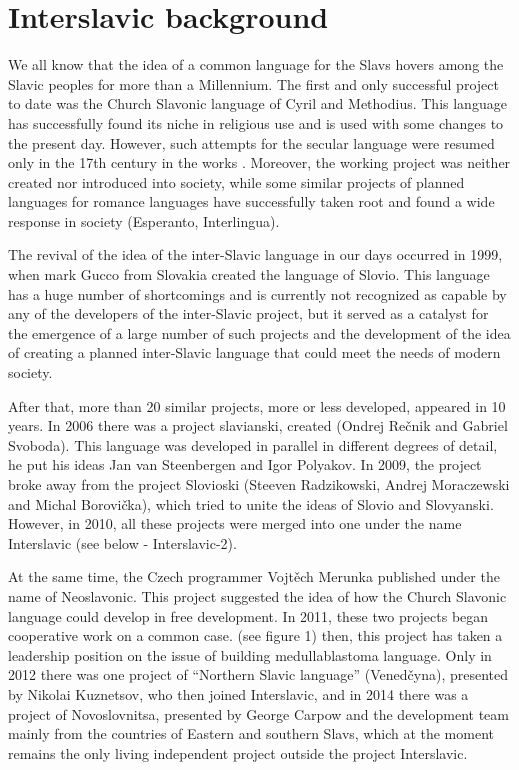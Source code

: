 \section{Interslavic background}

We all know that the idea of a common language for the Slavs hovers among the Slavic peoples for more than a Millennium. The first and only successful project to date was the Church Slavonic language of Cyril and Methodius. This language has successfully found its niche in religious use and is used with some changes to the present day. However, such attempts for the secular language were resumed only in the 17th century in the works \cite{krizhanich} \cite{matija}. Moreover, the working project was neither created nor introduced into society, while some similar projects of planned languages for romance languages have successfully taken root and found a wide response in society (Esperanto, Interlingua).

The revival of the idea of the inter-Slavic language in our days occurred in 1999, when mark Gucco from Slovakia created the language of Slovio. This language has a huge number of shortcomings and is currently not recognized as capable by any of the developers of the inter-Slavic project, but it served as a catalyst for the emergence of a large number of such projects and the development of the idea of creating a planned inter-Slavic language that could meet the needs of modern society. 

After that, more than 20 similar projects, more or less developed, appeared in 10 years. In 2006 there was a project slavianski, created (Ondrej Rečnik and Gabriel Svoboda). This language was developed in parallel in different degrees of detail, he put his ideas Jan van Steenbergen and Igor Polyakov. In 2009, the project broke away from the project Slovioski (Steeven Radzikowski, Andrej Moraczewski and Michal Borovička), which tried to unite the ideas of Slovio and Slovyanski. However, in 2010, all these projects were merged into one under the name Interslavic (see below - Interslavic-2).

At the same time, the Czech programmer Vojtěch Merunka published under the name of Neoslavonic. This project suggested the idea of how the Church Slavonic language could develop in free development. In 2011, these two projects began cooperative work on a common case. (see figure 1) then, this project has taken a leadership position on the issue of building medullablastoma language. Only in 2012 there was one project of “Northern Slavic language” (Venedčyna), presented by Nikolai Kuznetsov, who then joined Interslavic, and in 2014 there was a project of Novoslovnitsa, presented by George Carpow and the development team mainly from the countries of Eastern and southern Slavs, which at the moment remains the only living independent project outside the project Interslavic.

